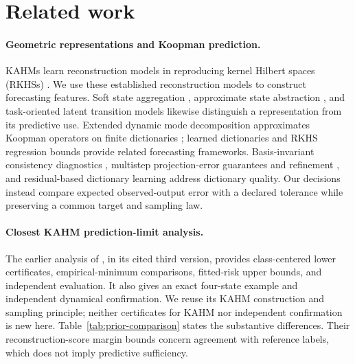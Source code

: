 \section{Related work}
\label{sec:related}

\paragraph{Geometric representations and Koopman prediction.}
KAHMs learn reconstruction models in reproducing kernel Hilbert spaces
(RKHSs) \citep{kumar2024kahm,kumar2025collaborative}. We use these established
reconstruction models to construct forecasting features.
Soft state aggregation \citep{singh1994soft}, approximate state abstraction
\citep{abel2016abstraction}, and task-oriented latent transition models
\citep{gelada2019deepmdp} likewise distinguish a representation from its
predictive use. Extended dynamic mode decomposition approximates Koopman
operators on finite dictionaries \citep{williams2015edmd}; learned dictionaries
\citep{li2017dictionary} and RKHS regression bounds \citep{kostic2022regression}
provide related forecasting frameworks. Basis-invariant consistency diagnostics
\citep{haseli2023consistency}, multistep projection-error guarantees and
refinement \citep{conradie2026trustworthy}, and residual-based dictionary
learning \citep{coote2026residual} address dictionary quality. Our decisions
instead compare expected observed-output error with a declared tolerance
while preserving a common target and sampling law.

\paragraph{Closest KAHM prediction-limit analysis.}
The earlier analysis of \citet{kumar2026limits}, in its cited third version, provides
class-centered lower certificates, empirical-minimum comparisons, fitted-risk
upper bounds, and independent evaluation. It also gives an exact four-state
example and independent dynamical confirmation. We reuse its KAHM
construction and sampling principle; neither certificates for KAHM nor
independent confirmation is new here. Table~\ref{tab:prior-comparison}
states the substantive differences. Their reconstruction-score margin bounds
concern agreement with reference labels, which does not imply predictive
sufficiency.

